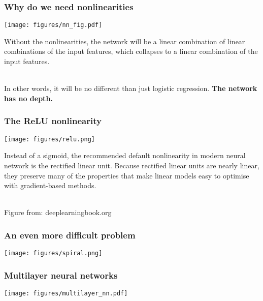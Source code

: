 \documentclass[notes]{beamer}          %
\begin{document}
\begin{frame}
\frametitle{Why do we need nonlinearities}
\begin{center}
\texttt{[image: figures/nn\_fig.pdf]} \\
\end{center}

Without the nonlinearities, the network will be a linear combination of linear combinations of the input features, which collapses to a linear combination of the input features. \\~\

In other words, it will be no different than just logistic regression. \textbf{The network has no depth.}
\end{frame}


\begin{frame}
\frametitle{The ReLU nonlinearity}
\begin{center}
\texttt{[image: figures/relu.png]} \\
\end{center}
Instead of a sigmoid, the recommended default nonlinearity in modern neural network is the rectified linear unit. Because rectified linear units are nearly linear, they preserve many of the properties that make linear models easy to optimise with gradient-based methods.\\~\

\tiny{Figure from: deeplearningbook.org}
\end{frame}

\begin{frame}
\frametitle{An even more difficult problem}
\begin{center}
\texttt{[image: figures/spiral.png]} \\
\end{center}
\end{frame}

\begin{frame}
\frametitle{Multilayer neural networks}
\begin{center}
\texttt{[image: figures/multilayer\_nn.pdf]} \\
\end{center}
\end{frame}

\begin{comment}

\begin{frame}
\frametitle{An even more difficult problem}
\begin{center}
\texttt{[image: figures/spiral.png]} \\
\end{center}
\begin{center}
\href{http://bit.ly/2RQY9zC}{Example} in Tensorflow Playground.
\end{center}
\end{frame}

\end{comment}
\end{document}
